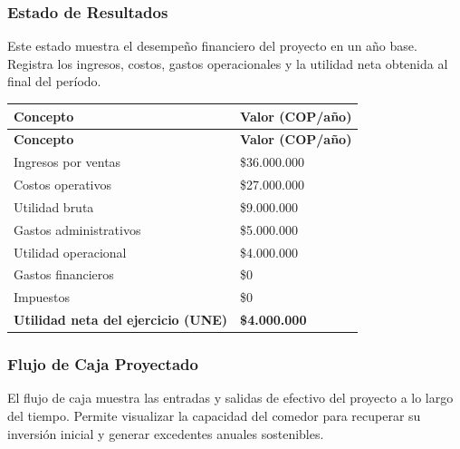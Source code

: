 \documentclass[letterpaper, 11pt]{report}
\begin{document}
\subsubsection{Estado de Resultados}
Este estado muestra el desempeño financiero del proyecto en un año base. Registra los ingresos, costos, gastos operacionales y la utilidad neta obtenida al final del período.

\bigskip

\begin{longtable}{|p{}|p{}|}
\hline
\textbf{Concepto} & \textbf{Valor (COP/año)} \\
\hline
\endfirsthead

\hline
\textbf{Concepto} & \textbf{Valor (COP/año)} \\
\hline
\endhead

\hline
\endfoot

\hline
\endlastfoot

Ingresos por ventas & \$36.000.000 \\
\hline
Costos operativos & \$27.000.000 \\
\hline
Utilidad bruta & \$9.000.000 \\
\hline
Gastos administrativos & \$5.000.000 \\
\hline
Utilidad operacional & \$4.000.000 \\
\hline
Gastos financieros & \$0 \\
\hline
Impuestos & \$0 \\
\hline
\textbf{Utilidad neta del ejercicio (UNE)} & \textbf{\$4.000.000} \\
\hline
\end{longtable}

\subsubsection{Flujo de Caja Proyectado}
El flujo de caja muestra las entradas y salidas de efectivo del proyecto a lo largo del tiempo. Permite visualizar la capacidad del comedor para recuperar su inversión inicial y generar excedentes anuales sostenibles.

\bigskip
\end{document}
